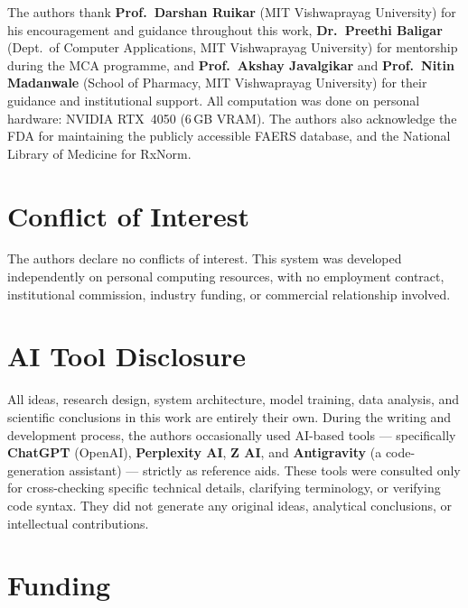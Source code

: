 \documentclass[10pt,twocolumn]{article}
\newcommand{\FAERS}{\textsf{FAERS}\xspace}
\begin{document}
The authors thank \textbf{Prof.\ Darshan Ruikar} (MIT Vishwaprayag
University) for his encouragement and guidance throughout this
work, \textbf{Dr.\ Preethi Baligar} (Dept.\ of Computer
Applications, MIT Vishwaprayag University) for mentorship during
the MCA programme, and \textbf{Prof.\ Akshay Javalgikar} and
\textbf{Prof.\ Nitin Madanwale} (School of Pharmacy, MIT
Vishwaprayag University) for their guidance and institutional support. All
computation was done on personal hardware: NVIDIA RTX~4050 (6\,GB
VRAM). The authors also acknowledge the FDA for maintaining the publicly
accessible \FAERS database, and the National Library of Medicine
for RxNorm.
 
\section*{Conflict of Interest}
 
The authors declare no conflicts of interest. This system was developed
independently on personal computing resources, with no employment
contract, institutional commission, industry funding, or commercial
relationship involved.
 
\section*{AI Tool Disclosure}
 
All ideas, research design, system architecture, model training,
data analysis, and scientific conclusions in this work are
entirely their own. During the writing and development process, the authors
occasionally used AI-based tools --- specifically
\textbf{ChatGPT} (OpenAI), \textbf{Perplexity AI},
\textbf{Z AI}, and \textbf{Antigravity} (a code-generation
assistant) --- strictly as reference aids. These tools were
consulted only for cross-checking specific technical details,
clarifying terminology, or verifying code syntax. They did not
generate any original ideas, analytical conclusions, or
intellectual contributions.
 
\section*{Funding}
 
\end{document}
